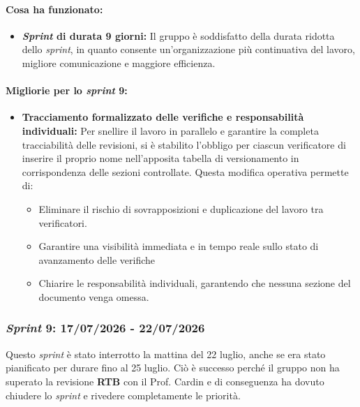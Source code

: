 \documentclass[12pt, a4paper]{article}
\begin{document}
{\paragraph{Cosa ha funzionato:}
\begin{itemize}
    \item \textbf{\textit{Sprint} di durata 9 giorni:} Il gruppo è soddisfatto della durata ridotta dello \textit{sprint}, in quanto consente un'organizzazione più continuativa del lavoro, migliore comunicazione e maggiore efficienza.
\end{itemize}


\paragraph{Migliorie per lo \textit{sprint} 9:}
\begin{itemize}
    \item \textbf{Tracciamento formalizzato delle verifiche e responsabilità individuali:} Per snellire il lavoro in parallelo e garantire la completa tracciabilità delle revisioni, si è stabilito l'obbligo per ciascun verificatore di inserire il proprio nome nell'apposita tabella di versionamento in corrispondenza delle sezioni controllate. Questa modifica operativa permette di:
    \begin{itemize}
        \item Eliminare il rischio di sovrapposizioni e duplicazione del lavoro tra verificatori.
        \item Garantire una visibilità immediata e in tempo reale sullo stato di avanzamento delle verifiche
        \item Chiarire le responsabilità individuali, garantendo che nessuna sezione del documento venga omessa.
    \end{itemize}
\end{itemize}



\subsubsection{\textit{Sprint} 9: 17/07/2026 - 22/07/2026}

Questo \textit{sprint} è stato interrotto la mattina del 22 luglio, anche se era stato pianificato per durare fino al 25 luglio. Ciò è successo perché il gruppo non ha superato la revisione \textbf{RTB} con il Prof. Cardin e di conseguenza ha dovuto chiudere lo \textit{sprint} e rivedere completamente le priorità.

}
\end{document}
